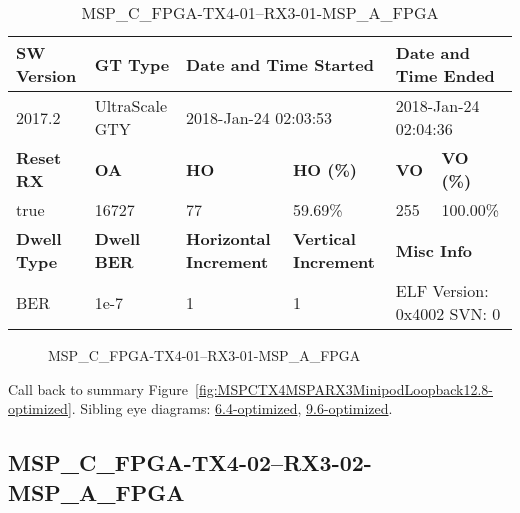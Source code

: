 \begin{table}[h]
\centering
\caption{MSP\_C\_FPGA-TX4-01--RX3-01-MSP\_A\_FPGA}
\label{tab:MSPCFPGATX401RX301MSPAFPGA12.8-optimized}
\begin{tabular}{@{}|l|l|l|l|l|l|@{}}
\toprule
\textbf{SW Version}                & \textbf{GT Type}   & \multicolumn{2}{l|}{\textbf{Date and Time Started}}            & \multicolumn{2}{l|}{\textbf{Date and Time Ended}}        \\ \midrule
2017.2                       & UltraScale GTY          & \multicolumn{2}{l|}{2018-Jan-24 02:03:53}                   & \multicolumn{2}{l|}{2018-Jan-24 02:04:36}               \\ \midrule
\textbf{Reset RX}                  & \textbf{OA} & \textbf{HO}   & \textbf{HO (\%)} & \textbf{VO} & \textbf{VO (\%)} \\ \midrule
true & 16727        & 77          & 59.69\%        & 255        & 100.00\%       \\ \midrule
\textbf{Dwell Type}                & \textbf{Dwell BER} & \textbf{Horizontal Increment} & \textbf{Vertical Increment}    & \multicolumn{2}{l|}{\textbf{Misc Info}}                  \\ \midrule
BER                            & 1e-7        & 1        & 1           & \multicolumn{2}{l|}{ELF Version: 0x4002 SVN: 0}                         \\ \bottomrule
\end{tabular}
\end{table}

\begin{figure}[h]
\caption{MSP\_C\_FPGA-TX4-01--RX3-01-MSP\_A\_FPGA} \label{fig:MSPCFPGATX401RX301MSPAFPGA12.8-optimized}
\end{figure}

Call back to summary Figure~\ref{fig:MSPCTX4MSPARX3MinipodLoopback12.8-optimized}.
Sibling eye diagrams: \hyperref[sec:MSPCFPGATX401RX301MSPAFPGA6.4-optimized]{6.4-optimized}, \hyperref[sec:MSPCFPGATX401RX301MSPAFPGA9.6-optimized]{9.6-optimized}.

\clearpage
\newpage


\subsection{MSP\_C\_FPGA-TX4-02--RX3-02-MSP\_A\_FPGA}\label{sec:MSPCFPGATX402RX302MSPAFPGA12.8-optimized}

